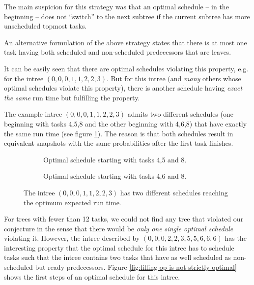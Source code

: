 The main suspicion for this strategy was that an optimal schedule -- in the beginning -- does not ``switch'' to the next subtree if the current subtree has more unscheduled topmost tasks.


An alternative formulation of the above strategy states that there is at most one task having both scheduled and non-scheduled predecessors that are leaves. 

It can be easily seen that there are optimal schedules violating this property, e.g. for the intree $(0,0,0,1,1,2,2,3)$. But for this intree (and \emph{many} others whose optimal schedules violate this property), there is another schedule having \emph{exact the same} run time but fulfilling the property.

The example intree $(0,0,0,1,1,2,2,3)$ admits two different schedules (one beginning with tasks 4,5,8 and the other beginning with 4,6,8) that have exactly the same run time (see figure \ref{fig:filling-up-without-loss-of-generality}). The reason is that both schedules result in equivalent snapshots with the same probabilities after the first task finishes.

\begin{figure}[th]
  \centering
  \begin{subfigure}{.45\textwidth}
    \centering
    
    \caption{Optimal schedule starting with tasks 4,5 and 8.}
  \end{subfigure}
  \quad
  \begin{subfigure}{.45\textwidth}
    \centering
    
    \caption{Optimal schedule starting with tasks 4,6 and 8.}
  \end{subfigure}
  \caption{The intree $(0,0,0,1,1,2,2,3)$ has two different schedules reaching the optimum expected run time.}
  \label{fig:filling-up-without-loss-of-generality}
\end{figure}

For trees with fewer than 12 tasks, we could not find any tree that violated our conjecture in the sense that there would be \emph{only one single optimal schedule} violating it. However, the intree described by $(0,0,0,2,2,3,5,5,6,6,6)$ has the interesting property that the optimal schedule for this intree has to schedule tasks such that the intree contains two tasks that have as well scheduled as non-scheduled but ready predecessors. Figure \ref{fig:filling-op-is-not-strictly-optimal} shows the first steps of an optimal schedule for this intree.

